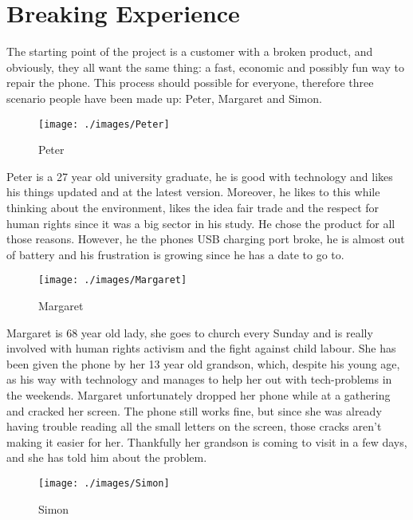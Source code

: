 \documentclass[final]{scrreprt} %
\begin{document}
\chapter{Breaking Experience}%
\label{ch:breaking-experience}
The starting point of the project is a customer with a broken product, and obviously, they all want the same thing: a fast, economic and possibly fun way to repair the phone. This process should possible for everyone, therefore three scenario people have been made up: Peter, Margaret and Simon.

\begin{wrapfigure}{L}{0.2\textwidth}
	\centering
	\texttt{[image: ./images/Peter]}
	\caption{\label{fig:Peter}Peter}
\end{wrapfigure}

Peter is a 27 year old university graduate, he is good with technology and likes his things updated and at the latest version. Moreover, he likes to this while thinking about the environment, likes the idea fair trade and the respect for human rights since it was a big sector in his study. He chose the product for all those reasons. However, he the phones USB charging port broke, he is almost out of battery and his frustration is growing since he has a date to go to. 

\begin{wrapfigure}{R}{0.2\textwidth}
	\centering
	\texttt{[image: ./images/Margaret]}
	\caption{\label{fig:Margaret}Margaret}
\end{wrapfigure}

Margaret is 68 year old lady, she goes to church every Sunday and is really involved with human rights activism and the fight against child labour. She has been given the phone by her 13 year old grandson, which, despite his young age, as his way with technology and manages to help her out with tech-problems in the weekends. Margaret unfortunately dropped her phone while at a gathering and cracked her screen. The phone still works fine, but since she was already having trouble reading all the small letters on the screen, those cracks aren't making it easier for her. Thankfully her grandson is coming to visit in a few days, and she has told him about the problem.

\begin{wrapfigure}{L}{0.2\textwidth}
	\centering
	\texttt{[image: ./images/Simon]}
	\caption{\label{fig:Simon}Simon}
\end{wrapfigure}
\end{document}
